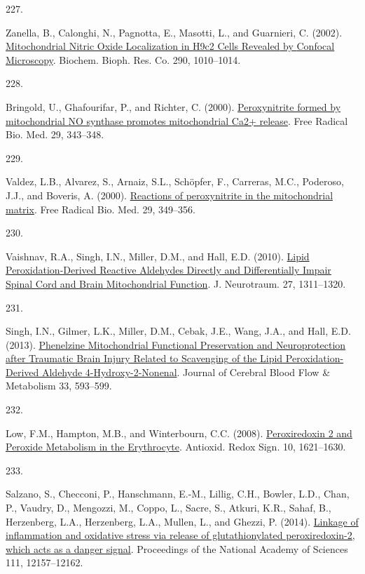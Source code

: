 \documentclass[
]{article}
\newlength{\cslhangindent}
\newlength{\csllabelwidth}
\newlength{\cslentryspacingunit} %
\newenvironment{CSLReferences}[2] %
 {%
  \setlength{\parindent}{0pt}
  \ifodd #1
  \let\oldpar\par
  \def\par{\hangindent=\cslhangindent\oldpar}
  \fi
  \setlength{\parskip}{#2\cslentryspacingunit}
 }%
 {}
\newcommand{\CSLLeftMargin}[1]{\parbox[t]{\csllabelwidth}{#1}}
\newcommand{\CSLRightInline}[1]{\parbox[t]{\linewidth - \csllabelwidth}{#1}\break}
\begin{document}
\begin{CSLReferences}{0}{0}
\leavevmode{}%
\CSLLeftMargin{227. }
\CSLRightInline{Zanella, B., Calonghi, N., Pagnotta, E., Masotti, L., and Guarnieri, C. (2002). \href{https://doi.org/10.1006/bbrc.2001.6284}{Mitochondrial {Nitric Oxide Localization} in {H9c2 Cells Revealed} by {Confocal Microscopy}}. Biochem. Bioph. Res. Co. 290, 1010--1014.}

\leavevmode{}%
\CSLLeftMargin{228. }
\CSLRightInline{Bringold, U., Ghafourifar, P., and Richter, C. (2000). \href{https://doi.org/10.1016/S0891-5849(00)00318-X}{Peroxynitrite formed by mitochondrial {NO} synthase promotes mitochondrial {Ca2}+ release}. Free Radical Bio. Med. 29, 343--348.}

\leavevmode{}%
\CSLLeftMargin{229. }
\CSLRightInline{Valdez, L.B., Alvarez, S., Arnaiz, S.L., Schöpfer, F., Carreras, M.C., Poderoso, J.J., and Boveris, A. (2000). \href{https://doi.org/10.1016/S0891-5849(00)00301-4}{Reactions of peroxynitrite in the mitochondrial matrix}. Free Radical Bio. Med. 29, 349--356.}

\leavevmode{}%
\CSLLeftMargin{230. }
\CSLRightInline{Vaishnav, R.A., Singh, I.N., Miller, D.M., and Hall, E.D. (2010). \href{https://doi.org/10.1089/neu.2009.1172}{Lipid {Peroxidation-Derived Reactive Aldehydes Directly} and {Differentially Impair Spinal Cord} and {Brain Mitochondrial Function}}. J. Neurotraum. 27, 1311--1320.}

\leavevmode{}%
\CSLLeftMargin{231. }
\CSLRightInline{Singh, I.N., Gilmer, L.K., Miller, D.M., Cebak, J.E., Wang, J.A., and Hall, E.D. (2013). \href{https://doi.org/10.1038/jcbfm.2012.211}{Phenelzine {Mitochondrial Functional Preservation} and {Neuroprotection} after {Traumatic Brain Injury Related} to {Scavenging} of the {Lipid Peroxidation-Derived Aldehyde} 4-{Hydroxy-2-Nonenal}}. Journal of Cerebral Blood Flow \& Metabolism 33, 593--599.}

\leavevmode{}%
\CSLLeftMargin{232. }
\CSLRightInline{Low, F.M., Hampton, M.B., and Winterbourn, C.C. (2008). \href{https://doi.org/10.1089/ars.2008.2081}{Peroxiredoxin 2 and {Peroxide Metabolism} in the {Erythrocyte}}. Antioxid. Redox Sign. 10, 1621--1630.}

\leavevmode{}%
\CSLLeftMargin{233. }
\CSLRightInline{Salzano, S., Checconi, P., Hanschmann, E.-M., Lillig, C.H., Bowler, L.D., Chan, P., Vaudry, D., Mengozzi, M., Coppo, L., Sacre, S., Atkuri, K.R., Sahaf, B., Herzenberg, L.A., Herzenberg, L.A., Mullen, L., and Ghezzi, P. (2014). \href{https://doi.org/10.1073/pnas.1401712111}{Linkage of inflammation and oxidative stress via release of glutathionylated peroxiredoxin-2, which acts as a danger signal}. Proceedings of the National Academy of Sciences 111, 12157--12162.}


\end{CSLReferences}
\end{document}
